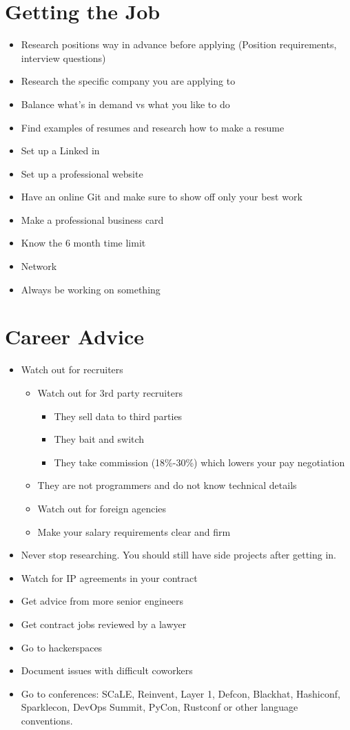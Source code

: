 \documentclass[12pt]{article}
\begin{document}
\section{Getting the Job}
\begin{itemize}
\item Research positions way in advance before applying (Position
  requirements, interview questions)
\item Research the specific company you are applying to
\item Balance what's in demand vs what you like to do
\item Find examples of resumes and research how to make a resume
\item Set up a Linked in
\item Set up a professional website
\item Have an online Git and make sure to show off only your best work
\item Make a professional business card
\item Know the 6 month time limit
\item Network
\item Always be working on something
\end{itemize}

\section{Career Advice}
\begin{itemize}
\item Watch out for recruiters
  \begin{itemize}
  \item Watch out for 3rd party recruiters
    \begin{itemize}
    \item They sell data to third parties
    \item They bait and switch
    \item They take commission (18\%-30\%) which lowers your pay
      negotiation
    \end{itemize}
  \item They are not programmers and do not know technical details
  \item Watch out for foreign agencies
  \item Make your salary requirements clear and firm
  \end{itemize}
\item Never stop researching. You should still have side projects
  after getting in.
\item Watch for IP agreements in your contract
\item Get advice from more senior engineers
\item Get contract jobs reviewed by a lawyer
\item Go to hackerspaces
\item Document issues with difficult coworkers
\item Go to conferences: SCaLE, Reinvent, Layer 1, Defcon, Blackhat,
  Hashiconf, Sparklecon, DevOps Summit, PyCon, Rustconf or other
  language conventions.
\end{itemize}
\end{document}
